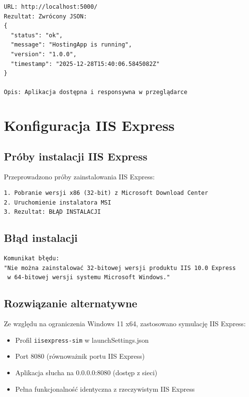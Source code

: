 \documentclass[twoside]{article}
\begin{document}
\begin{verbatim}
URL: http://localhost:5000/
Rezultat: Zwrócony JSON:
{
  "status": "ok",
  "message": "HostingApp is running",
  "version": "1.0.0",
  "timestamp": "2025-12-28T15:40:06.5845082Z"
}

Opis: Aplikacja dostępna i responsywna w przeglądarce
\end{verbatim}

\section{Konfiguracja IIS Express}

\subsection{Próby instalacji IIS Express}

Przeprowadzono próby zainstalowania IIS Express:

\begin{verbatim}
1. Pobranie wersji x86 (32-bit) z Microsoft Download Center
2. Uruchomienie instalatora MSI
3. Rezultat: BŁĄD INSTALACJI
\end{verbatim}

\subsection{Błąd instalacji}

\begin{verbatim}
Komunikat błędu:
"Nie można zainstalować 32-bitowej wersji produktu IIS 10.0 Express 
 w 64-bitowej wersji systemu Microsoft Windows."

\end{verbatim}

\subsection{Rozwiązanie alternatywne}

Ze względu na ograniczenia Windows 11 x64, zastosowano symulację IIS Express:

\begin{itemize}
	\item Profil \texttt{iisexpress-sim} w launchSettings.json
	\item Port 8080 (równoważnik portu IIS Express)
	\item Aplikacja słucha na 0.0.0.0:8080 (dostęp z sieci)
	\item Pełna funkcjonalność identyczna z rzeczywistym IIS Express
\end{itemize}
\end{document}
